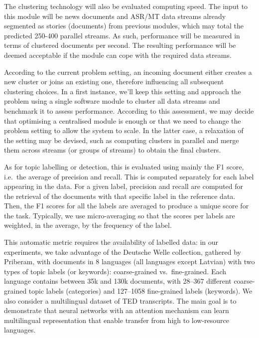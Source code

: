 The clustering technology will also be evaluated  computing speed. The input to this module will be news documents and ASR/MT data streams already segmented as stories (documents) from previous modules, which may total the predicted 250-400 parallel \SUMMA streams. As such, performance will be measured in terms of clustered documents per second. The resulting performance will be deemed acceptable if the module can cope with the required data streams.

According to the current problem setting, an incoming document either creates a new cluster or joins an existing one, therefore influencing all subsequent clustering choices. In a first instance, we'll keep this setting and approach the problem using a single software module to cluster all data streams and benchmark it to assess performance. According to this assessment, we may decide that optimising a centralised module is enough or that we need to change the problem setting to allow the system to scale. In the latter case, a relaxation of the setting may be devised, such as computing clusters in parallel and merge them across streams (or groups of streams) to obtain the final clusters.

As for topic labelling or detection, this is evaluated using mainly the F1 score, i.e.\ the average of precision and recall.  This is computed separately for each label appearing in the data.  For a given label, precision and recall are computed for the retrieval of the documents with that specific label in the reference data.  Then, the F1 scores for all the labels are averaged to produce a unique score for the task.  Typically, we use micro-averaging so that the scores per labels are weighted, in the average, by the frequency of the label.

This automatic metric requires the availability of labelled data: in our experiments, we take advantage of the Deutsche Welle collection, gathered by Priberam, with documents in 8 languages (all \SUMMA languages except Latvian) with two types of topic labels (or keywords): coarse-grained vs.\ fine-grained. Each language contains between 35k and 130k documents, with 28--367 different coarse-grained topic labels (categories) and 127--1058 fine-grained labels (keywords).  We also consider a multilingual dataset of TED transcripts.  The main goal is to demonstrate that neural networks with an attention mechanism can learn multilingual representation that enable transfer from high to low-resource languages.


